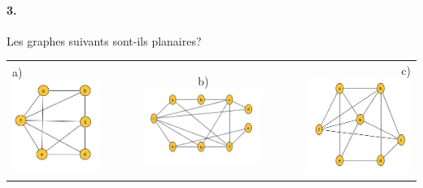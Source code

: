 \paragraph{3. }Les graphes suivants sont-ils planaires?

\begin{tabular}{lcccr}
a)
\includegraphics[scale=.4]{ape9_ex3_a_1.jpg}
& $\qquad$ & b) \includegraphics[scale=.4]{ape9_ex3_b_1.jpg}
& $\qquad$ & c) \includegraphics[scale=.4]{ape9_ex3_c_1.jpg} \\
\end{tabular} 

\bigskip 


